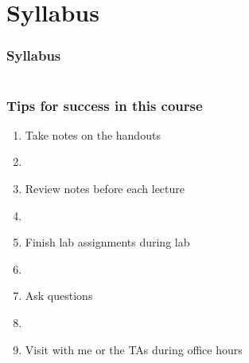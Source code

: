 \documentclass[color=usenames,dvipsnames]{beamer}
\begin{document}
\section{Syllabus}


\begin{frame}
  \frametitle{Syllabus}
  \begin{columns}%
    \begin{column}{0.5\textwidth}
    \end{column}
  \end{columns}
\end{frame}




\begin{frame}
  \frametitle{Tips for success in this course}
  \begin{enumerate}[<+->][(1)]
    \large
    \item Take notes on the handouts 
    \item[]
    \item Review notes before each lecture 
    \item[]
    \item Finish lab assignments during lab %
    \item[]
    \item Ask questions %
    \item[]
    \item Visit with me or the TAs during office hours %
  \end{enumerate}
\end{frame}
\end{document}

